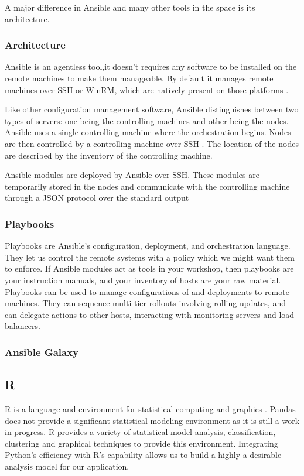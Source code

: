 \documentclass[9pt,twocolumn,twoside]{../../styles/osajnl}
\begin{document}
A major difference in Ansible and many other tools in the
space is its architecture.

\subsubsection{Architecture}
Ansible is an agentless tool,it doesn't requires any software to be
installed on the remote machines to make them manageable. By default
it manages remote machines over SSH or WinRM, which are natively
present on those platforms \cite{www-ansible-architecture}.

Like other configuration management software, Ansible
distinguishes between two types of servers: one being the controlling
machines and other being the nodes. Ansible uses a single controlling
machine where the orchestration begins. Nodes are then controlled by a
controlling machine over SSH \cite{www-ssh}. The location of the nodes
are described by the inventory of the controlling machine.

Ansible modules are deployed by Ansible over SSH. These modules are
temporarily stored in the nodes and communicate with the controlling
machine through a JSON protocol over the standard output

\subsubsection{Playbooks}

Playbooks \cite{www-ansible-playbook} are Ansible’s configuration,
deployment, and orchestration language. They let us control the remote
systems with a policy which we might want them to enforce. If Ansible
modules act as tools in your workshop, then playbooks are your
instruction manuals, and your inventory of hosts are your raw
material. Playbooks can be used to manage configurations of and
deployments to remote machines. They can sequence multi-tier rollouts
involving rolling updates, and can delegate actions to other hosts,
interacting with monitoring servers and load balancers.

\subsubsection{Ansible Galaxy}

\subsection{R}
R is a language and environment for statistical computing and graphics
\cite{www-about-rproject}. Pandas does not provide a significant
statistical modeling environment as it is still a work in progress. R
provides a variety of statistical model analysis, classification,
clustering and graphical techniques to provide this
environment. Integrating Python's efficiency with R's capability
allows us to build a highly a desirable analysis model for our
application.
\end{document}
